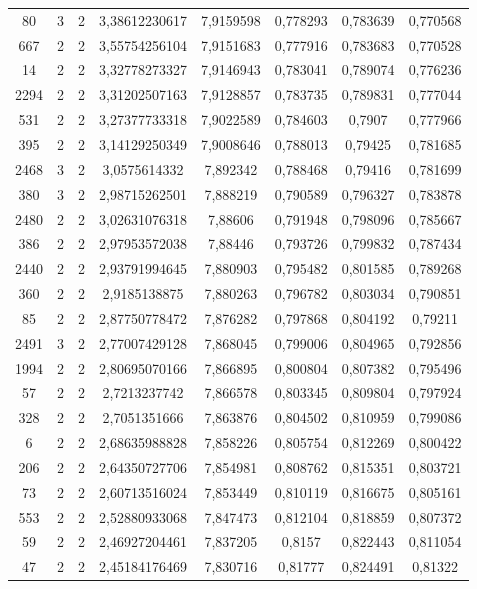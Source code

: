 \begin{longtable}{|c|c|c|c|c|c|c|c|}
80 & 3 & 2 & 3,38612230617 & 7,9159598 & 0,778293 & 0,783639 & 0,770568 \\
667 & 2 & 2 & 3,55754256104 & 7,9151683 & 0,777916 & 0,783683 & 0,770528 \\
14 & 2 & 2 & 3,32778273327 & 7,9146943 & 0,783041 & 0,789074 & 0,776236 \\
2294 & 2 & 2 & 3,31202507163 & 7,9128857 & 0,783735 & 0,789831 & 0,777044 \\
531 & 2 & 2 & 3,27377733318 & 7,9022589 & 0,784603 & 0,7907 & 0,777966 \\
395 & 2 & 2 & 3,14129250349 & 7,9008646 & 0,788013 & 0,79425 & 0,781685 \\
2468 & 3 & 2 & 3,0575614332 & 7,892342 & 0,788468 & 0,79416 & 0,781699 \\
380 & 3 & 2 & 2,98715262501 & 7,888219 & 0,790589 & 0,796327 & 0,783878 \\
2480 & 2 & 2 & 3,02631076318 & 7,88606 & 0,791948 & 0,798096 & 0,785667 \\
386 & 2 & 2 & 2,97953572038 & 7,88446 & 0,793726 & 0,799832 & 0,787434 \\
2440 & 2 & 2 & 2,93791994645 & 7,880903 & 0,795482 & 0,801585 & 0,789268 \\
360 & 2 & 2 & 2,9185138875 & 7,880263 & 0,796782 & 0,803034 & 0,790851 \\
85 & 2 & 2 & 2,87750778472 & 7,876282 & 0,797868 & 0,804192 & 0,79211 \\
2491 & 3 & 2 & 2,77007429128 & 7,868045 & 0,799006 & 0,804965 & 0,792856 \\
1994 & 2 & 2 & 2,80695070166 & 7,866895 & 0,800804 & 0,807382 & 0,795496 \\
57 & 2 & 2 & 2,7213237742 & 7,866578 & 0,803345 & 0,809804 & 0,797924 \\
328 & 2 & 2 & 2,7051351666 & 7,863876 & 0,804502 & 0,810959 & 0,799086 \\
6 & 2 & 2 & 2,68635988828 & 7,858226 & 0,805754 & 0,812269 & 0,800422 \\
206 & 2 & 2 & 2,64350727706 & 7,854981 & 0,808762 & 0,815351 & 0,803721 \\
73 & 2 & 2 & 2,60713516024 & 7,853449 & 0,810119 & 0,816675 & 0,805161 \\
553 & 2 & 2 & 2,52880933068 & 7,847473 & 0,812104 & 0,818859 & 0,807372 \\
59 & 2 & 2 & 2,46927204461 & 7,837205 & 0,8157 & 0,822443 & 0,811054 \\
47 & 2 & 2 & 2,45184176469 & 7,830716 & 0,81777 & 0,824491 & 0,81322 \\

\end{longtable}
